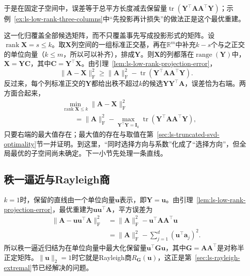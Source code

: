于是在固定子空间中，误差等于总平方长度减去保留量$\operatorname{tr}(\bm Y^\top\bm A\bm A^\top\bm Y)$；示例~\ref{ex:ls-low-rank-three-columns}中“先投影再计损失”的做法正是这个最优重建。

这一化归覆盖全部候选矩阵，而不只覆盖事先写成投影形式的矩阵。设$\operatorname{rank}\bm X=s\leq k$。取$\bm X$列空间的一组标准正交基，再在$\mathbb R^m$中补充$k-s$个与之正交的单位向量（$k\leq m$，所以可以补齐），排成$\bm Y$。则$\bm X$的列都落在$\operatorname{range}(\bm Y)$中，$\bm X=\bm Y\bm C$，其中$\bm C=\bm Y^\top\bm X$。由引理~\ref{lem:ls-low-rank-projection-error}，
\[
 \lVert\bm A-\bm X\rVert_{\mathrm F}^2\geq\lVert\bm A\rVert_{\mathrm F}^2-\operatorname{tr}(\bm Y^\top\bm A\bm A^\top\bm Y).
\]
反过来，每个列标准正交的$\bm Y$都给出秩不超过$k$的候选$\bm Y\bm Y^\top\bm A$，误差恰为右端。两方面合起来，
\begin{equation}
 \begin{aligned}
 &\min_{\operatorname{rank}\bm X\leq k}\lVert\bm A-\bm X\rVert_{\mathrm F}^2\\
 &\qquad=\lVert\bm A\rVert_{\mathrm F}^2-\max_{\bm Y^\top\bm Y=\bm I_k}\operatorname{tr}(\bm Y^\top\bm A\bm A^\top\bm Y),
 \end{aligned}
 \label{eq:ls-low-rank-subspace-reduction}
\end{equation}
只要右端的最大值存在；最大值的存在与取值在第~\ref{sec:ls-truncated-svd-optimality}节一并证明。到这里，“同时选择方向与系数”化成了“选择方向”，但全局最优的子空间尚未确定。下一小节先处理一条直线。

\subsection{秩一逼近与Rayleigh商}
\label{sec:ls-rank-one-rayleigh}

$k=1$时，保留的直线由一个单位向量$\bm u$表示，即$\bm Y=\bm u$。由引理~\ref{lem:ls-low-rank-projection-error}，最优重建为$\bm u\bm u^\top\bm A$，平方误差为
\[
 \begin{aligned}
 \lVert\bm A-\bm u\bm u^\top\bm A\rVert_{\mathrm F}^2
 &=\lVert\bm A\rVert_{\mathrm F}^2-\bm u^\top\bm A\bm A^\top\bm u\\
 &=\lVert\bm A\rVert_{\mathrm F}^2-\sum_{j=1}^d(\bm u^\top\bm a_j)^2 .
 \end{aligned}
\]
所以秩一逼近归结为在单位向量中最大化保留量$\bm u^\top\bm G\bm u$，其中$\bm G=\bm A\bm A^\top$是对称半正定矩阵。$\lVert\bm u\rVert_2=1$时它就是Rayleigh商$R_{\bm G}(\bm u)$，这正是第~\ref{sec:ls-rayleigh-extremal}节已经解决的问题。

